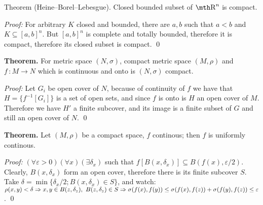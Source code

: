 \proclaim Theorem (Heine--Borel--Lebesgue). Closed bounded subset of $\R^n$ is
compact.

{\it Proof:} For arbitrary $K$ closed and bounded, there are $a,b$ such that
$a<b$ and $K\subseteq [a,b]^n$. But $[a,b]^n$ is complete and totally bounded,
therefore it is compact, therefore its closed subset is compact.
\qed

{\bf Theorem.} For metric space $(N,\sigma)$, compact metric space
$(M,\rho)$ and $f\,:M\to N$ which is continuous and onto is $(N,\sigma)$
compact. 

{\it Proof:}
Let $G_i$ be open cover of $N$, because of continuity of $f$ we have that
$H = \{f^{-1}[G_i]\}$ is a set of open sets, and since $f$ is onto is $H$ an
open cover of $M$. Therefore we have $H'$ a finite subcover, and its image is a
finite subset of $G$ and still an open cover of $N$.
\qed

{\bf Theorem.} Let $(M,\rho)$ be a compact space, $f$ continous; then $f$
is uniformly continous.

{\it Proof:} $(\forall \varepsilon>0)(\forall x)(\exists \delta_x)$ such that 
$f[B(x,\delta_x)] \subseteq B(f(x),\varepsilon/2)$. Clearly, $B(x,\delta_x)$ 
form an open cover,
therefore there is its finite subcover $S$. Take $\delta =
\min\{\delta_x/2;B(x,\delta_x)\in S\}$, and watch: $\rho(x,y) < \delta
\Rightarrow x,y \in B(z,\delta_z),\ B(z,\delta_z)\in S \Rightarrow \sigma(f(x),f(y))
\leq \sigma(f(x),f(z)) + \sigma(f(y),f(z)) \leq \varepsilon$.
\qed
